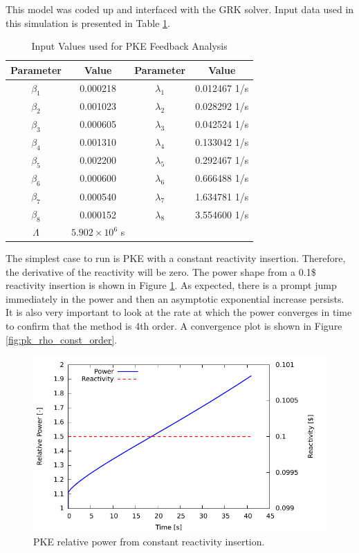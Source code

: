 \documentclass{ansconf}
\numberwithin{equation}{section}
\begin{document}
This model was coded up and interfaced with the GRK solver. Input data used in this simulation is presented in Table \ref{tab:pk_input}.
\begin{table}
\caption{Input Values used for PKE Feedback Analysis}
\label{tab:pk_input}
\centering
\begin{tabular}{cc||cc}
\toprule 
Parameter & Value & Parameter & Value\tabularnewline
\midrule
\midrule 
$\beta_1$ & 0.000218 & $\lambda_1$ & 0.012467 1/s \tabularnewline
$\beta_2$ & 0.001023 & $\lambda_2$ & 0.028292 1/s \tabularnewline
$\beta_3$ & 0.000605 & $\lambda_3$ & 0.042524 1/s \tabularnewline
$\beta_4$ & 0.001310 & $\lambda_4$ & 0.133042 1/s \tabularnewline
$\beta_5$ & 0.002200 & $\lambda_5$ & 0.292467 1/s \tabularnewline
$\beta_6$ & 0.000600 & $\lambda_6$ & 0.666488 1/s \tabularnewline
$\beta_7$ & 0.000540 & $\lambda_7$ & 1.634781 1/s \tabularnewline
$\beta_8$ & 0.000152 & $\lambda_8$ & 3.554600 1/s \tabularnewline
$\Lambda$ & $5.902\times 10^6$ s & & \tabularnewline
\bottomrule
\end{tabular}
\end{table}
The simplest case to run is PKE with a constant reactivity insertion. Therefore, the derivative of the reactivity will be zero. The power shape from a 0.1\$ reactivity insertion is shown in Figure \ref{fig:pk_rho_const_power}. As expected, there is a prompt jump immediately in the power and then an asymptotic exponential increase persists.  It is also very important to look at the rate at which the power converges in time to confirm that the method is 4th order. A convergence plot is shown in Figure \ref{fig:pk_rho_const_order}.
\begin{figure} 
\centering \includegraphics[scale=1.00]{./figs/pk_rho_const_power.pdf}
\caption{PKE relative power from constant reactivity insertion.}
\label{fig:pk_rho_const_power}
\end{figure}
\end{document}
